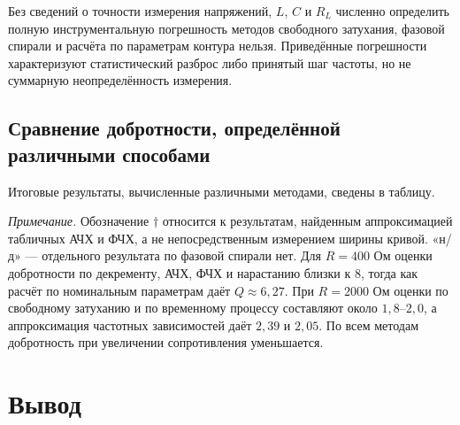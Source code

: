 \documentclass[a4paper,14pt]{extarticle}
\begin{document}
Без сведений о точности измерения напряжений, $L$, $C$
и $R_L$ численно определить полную инструментальную
погрешность методов свободного затухания, фазовой спирали
и расчёта по параметрам контура нельзя. Приведённые погрешности
характеризуют статистический разброс либо принятый шаг частоты,
но не суммарную неопределённость измерения.

\newpage

\subsection{Сравнение добротности, определённой различными способами}
Итоговые результаты, вычисленные различными методами, сведены в таблицу.
\begin{table}[H]
\centering
\small
\caption{Добротность контура, определённая различными способами}
\end{table}

\noindent\textit{Примечание.} Обозначение
$\dagger$ относится к результатам, найденным аппроксимацией
табличных АЧХ и ФЧХ, а не непосредственным измерением ширины
кривой. «н/д» --- отдельного результата по фазовой спирали нет.
Для $R=400$ Ом оценки добротности по декременту,
АЧХ, ФЧХ и нарастанию близки к $8$, тогда как
расчёт по номинальным параметрам даёт $Q\approx6{,}27$.
При $R=2000$ Ом оценки по свободному затуханию и по
временному процессу составляют около $1{,}8$--$2{,}0$,
а аппроксимация частотных зависимостей даёт $2{,}39$
и $2{,}05$. По всем методам добротность при увеличении
сопротивления уменьшается.



\section*{Вывод}
\end{document}
